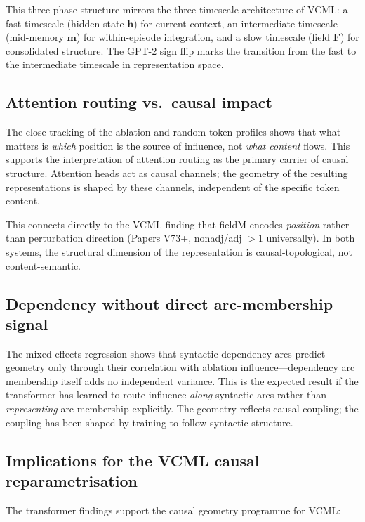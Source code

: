 \documentclass[11pt,a4paper]{article}
\begin{document}
This three-phase structure mirrors the three-timescale architecture of VCML:
a fast timescale (hidden state $\mathbf{h}$) for current context,
an intermediate timescale (mid-memory $\mathbf{m}$) for within-episode integration,
and a slow timescale (field $\mathbf{F}$) for consolidated structure.
The GPT-2 sign flip marks the transition from the fast to the intermediate timescale
in representation space.

\subsection{Attention routing vs.\ causal impact}

The close tracking of the ablation and random-token profiles shows that what matters
is \emph{which} position is the source of influence, not \emph{what content} flows.
This supports the interpretation of attention routing as the primary carrier of
causal structure.
Attention heads act as causal channels; the geometry of the resulting representations
is shaped by these channels, independent of the specific token content.

This connects directly to the VCML finding that fieldM encodes \emph{position}
rather than perturbation direction (Papers V73+, nonadj/adj $> 1$ universally).
In both systems, the structural dimension of the representation is causal-topological,
not content-semantic.

\subsection{Dependency without direct arc-membership signal}

The mixed-effects regression shows that syntactic dependency arcs predict geometry
only through their correlation with ablation influence---dependency arc membership
itself adds no independent variance.
This is the expected result if the transformer has learned to route influence
\emph{along} syntactic arcs rather than \emph{representing} arc membership explicitly.
The geometry reflects causal coupling; the coupling has been shaped by training
to follow syntactic structure.

\subsection{Implications for the VCML causal reparametrisation}

The transformer findings support the causal geometry programme for VCML:
\end{document}
